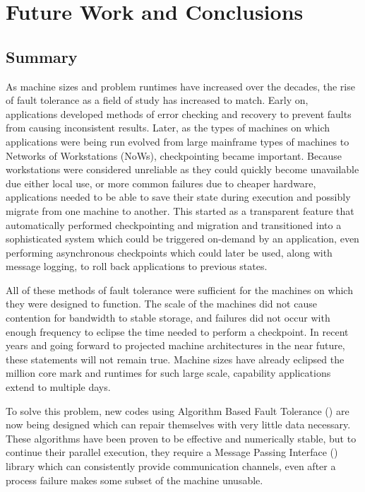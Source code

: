 \chapter{Future Work and Conclusions}
\label{chap:conclusions}

\section{Summary}
\label{chap:conclusions:summary}

As machine sizes and problem runtimes have increased over the decades, the rise 
of fault tolerance as a field of study has increased to match. Early on, 
applications developed methods of error checking and recovery to prevent faults from 
causing inconsistent results. Later, as the 
types of machines on which applications were being run evolved from large 
mainframe types of machines to Networks of Workstations (NoWs), checkpointing 
became important. Because workstations were considered unreliable as they could 
quickly become unavailable due either local use, or more common failures due to 
cheaper hardware, applications needed to be able to save their state during 
execution and possibly migrate from one machine to another. This started as a 
transparent feature that automatically performed checkpointing and migration and 
transitioned into a sophisticated system which could be triggered on-demand by an 
application, even performing asynchronous checkpoints which could later be used, 
along with message logging, to roll back applications to previous states.

All of these methods of fault tolerance were sufficient for the machines on which 
they were designed to function. The scale of the machines did not cause 
contention for bandwidth to stable storage, and failures did not occur with enough 
frequency to eclipse the time needed to perform a checkpoint. In recent years and 
going forward to projected machine architectures in the near future, these 
statements will not remain true. Machine sizes have already eclipsed the million 
core mark and runtimes for such large scale, capability applications extend to 
multiple days. 

To solve this problem, new codes using Algorithm Based Fault Tolerance (\abft) 
are now being designed which can repair themselves with very little data 
necessary. These algorithms have been proven to be effective and 
numerically stable, but to continue their parallel execution, they require a 
Message Passing Interface (\mpi) library which can consistently provide 
communication channels, even after a process failure makes some subset of the 
machine unusable.

